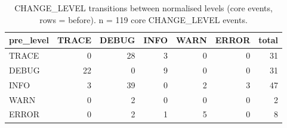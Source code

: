 \begin{table}[htbp]
\centering
\small
\caption{CHANGE\_LEVEL transitions between normalised levels (core events, rows = before). n = 119 core CHANGE\_LEVEL events.}
\label{tab:rq1_transitions}
\begin{tabular}{lrrrrrr}
\toprule
pre\_level & TRACE & DEBUG & INFO & WARN & ERROR & total \\
\midrule
TRACE & 0 & 28 & 3 & 0 & 0 & 31 \\
DEBUG & 22 & 0 & 9 & 0 & 0 & 31 \\
INFO & 3 & 39 & 0 & 2 & 3 & 47 \\
WARN & 0 & 2 & 0 & 0 & 0 & 2 \\
ERROR & 0 & 2 & 1 & 5 & 0 & 8 \\
\bottomrule
\end{tabular}
\end{table}
